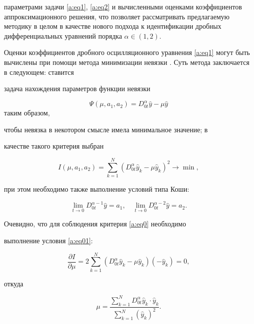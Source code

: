 параметрами задачи \eqref{a:eq1}, \eqref{a:eq2} и вычисленными оценками коэффициентов аппроксимационного решения, что позволяет рассматривать предлагаемую методику в целом в качестве нового подхода к идентификации дробных дифференциальных уравнений порядка $\alpha\in (1, 2)$.



Оценки ко\-эф\-фи\-циен\-тов дробного осцилляционного уравнения \eqref{a:eq1} могут быть вычислены при помощи метода минимизации невязки \cite{v:Ch}. Суть метода заключается в следующем: ставится

задача нахождения параметров функции невязки 

$$\Psi (\mu,a_1,a_2)=D_{0t}^{\alpha}\hat{y}-\mu \hat{y}$$ таким образом,

чтобы невязка в некотором смысле имела минимальное значение; в

качестве такого критерия выбран

 \begin{equation}   \label{a:eq0}

 I (\mu,a_1,a_2)=\sum \limits_{k=1}^{N} {\left(D_{0t}^{\alpha}\hat{y}_k-\mu \hat{y}_k \right)^2} \rightarrow \min,

 \end{equation}

при этом необходимо также выполнение условий  типа Коши:

 \begin{equation}   \label{a:eq00}

\lim \limits_{t \rightarrow 0}{D_{0t}^{\alpha-1}\hat{y}}=a_1, \quad 

\lim \limits_{t \rightarrow 0}{D_{0t}^{\alpha-2}\hat{y}}=a_2.

 \end{equation}

Очевидно, что для соблюдения критерия \eqref{a:eq0} необходимо

выполнение условия \eqref{a:eq01}:

 \begin{equation}   \label{a:eq01}

 \dfrac {\partial I}{\partial \mu}=2 \sum \limits_{k=1}^{N} {(D_{0t}^{\alpha}\hat{y}_k-\mu \hat{y}_k)(- \hat{y}_k)}=0,

 \end{equation}

откуда

 \begin{equation}   \label{a:eq02}

 \mu= \dfrac { \sum_{k=1}^{N} {D_{0t}^{\alpha}\hat{y}_k \cdot \hat{y}_k}}{\sum _{k=1}^{N} {(\hat{y}_k)^2}}.

 \end{equation}



